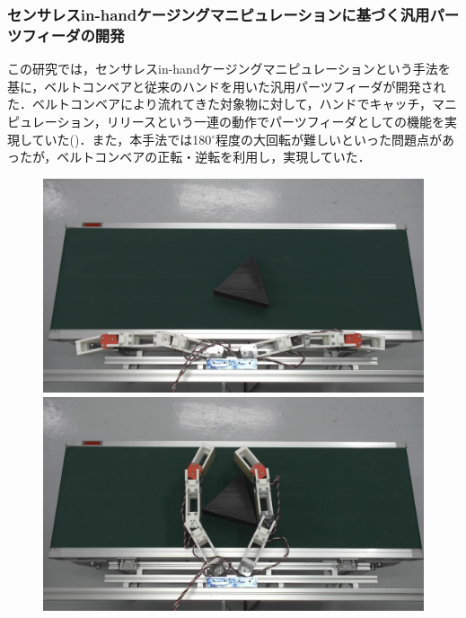 \documentclass[a4paper,twoside,12pt,papersize, dvipdfmx]{iirthesis}
\begin{document}
\subsubsection{センサレスin-handケージングマニピュレーションに基づく汎用パーツフィーダの開発 \cite{kamikukita2022}}
この研究では，センサレスin-handケージングマニピュレーションという手法を基に，ベルトコンベアと従来のハンドを用いた汎用パーツフィーダが開発された．ベルトコンベアにより流れてきた対象物に対して，ハンドでキャッチ，マニピュレーション，リリースという一連の動作でパーツフィーダとしての機能を実現していた()．また，本手法では180$^\circ$程度の大回転が難しいといった問題点があったが，ベルトコンベアの正転・逆転を利用し，実現していた．
\begin{figure}[b]
\begin{minipage}{0.49\hsize}
\centering
\includegraphics[width=\hsize]{fig/1-introduction/triangle_Moment_2.jpg}
\subcaption{}
\end{minipage}\hfill
\begin{minipage}{0.49\hsize}
\centering
\includegraphics[width=\hsize]{fig/1-introduction/triangle_Moment_3.jpg}

\end{minipage}
\end{figure}
\end{document}
